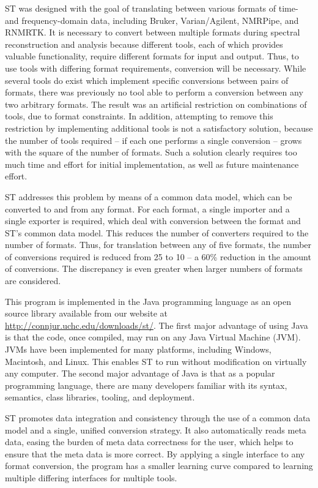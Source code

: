 ST was designed with the goal of translating between various formats of time- 
and frequency-domain data, including Bruker, Varian/Agilent, NMRPipe, and RNMRTK.
It is necessary to convert between multiple formats during spectral 
reconstruction and analysis because different tools, each of which provides
valuable functionality, require different formats for input and output.
Thus, to use tools with differing format requirements, conversion will be
necessary.  While several tools do exist which implement specific conversions
between pairs of formats, there was previously no tool able to perform a
conversion between any two arbitrary formats.  The result was an artificial
restriction on combinations of tools, due to format constraints.  In addition,
attempting to remove this restriction by implementing additional tools is not
a satisfactory solution, because the number of tools required -- if each one
performs a single conversion -- grows with the square of the number of formats.
Such a solution clearly requires too much time and effort for initial
implementation, as well as future maintenance effort.

ST addresses this problem by means of a common data model,
which can be converted to and from any format.  For each format, a single
importer and a single exporter is required, which deal with conversion between
the format and ST's common data model.  This reduces the number
of converters required to the number of formats.  Thus, for translation between
any of five formats, the number of conversions required is reduced from 25 to
10 -- a 60\% reduction in the amount of conversions.  The discrepancy is even
greater when larger numbers of formats are considered.

This program is implemented in the Java programming language as an open source
library available from our website at \url{http://connjur.uchc.edu/downloads/st/}.
The first major advantage of using Java is that the
code, once compiled, may run on any Java Virtual Machine (JVM).  JVMs have been
implemented for many platforms, including Windows, Macintosh, and Linux.
This enables ST to run without modification on virtually any computer.  
The second major advantage of Java is that as a popular programming 
language, there are many developers familiar with its syntax, semantics, 
class libraries, tooling, and deployment.

ST promotes data integration and consistency through the use
of a common data model and a single, unified conversion strategy.  It also
automatically reads meta data, easing the
burden of meta data correctness for the user, which helps to ensure that the
meta data is more correct.  By applying a single interface to any format
conversion, the program has a smaller learning curve compared to learning
multiple differing interfaces for multiple tools.

